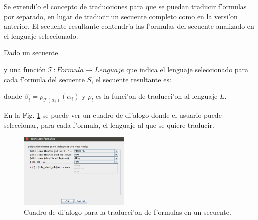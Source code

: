 Se extendi'o el concepto de traducciones para que se puedan traducir f'ormulas por separado, en lugar de traducir un secuente completo como en la versi'on anterior.
El secuente resultante contendr'a las f'ormulas del secuente analizado en el lenguaje seleccionado.

Dado un secuente 

\begin{prooftree}
\end{prooftree}
y una función  $\mathcal{T}:Formula\rightarrow Lenguaje$ que indica el lenguaje seleccionado para cada f'ormula del secuente $S$, el secuente resultante es:
\begin{prooftree}
\end{prooftree}
donde 
$\beta_{i} = \rho_{\mathcal{T}(\alpha_i)}(\alpha_i)$ y $\rho_l$ es la funci'on de traducci'on al lenguaje $L$.

En la Fig. \ref{GUI form translation} se puede ver un cuadro de di'alogo donde el usuario puede seleccionar, para cada f'ormula, el lenguaje al que se quiere traducir.

\begin{figure}[tbh]
	\includegraphics[width=200px]{img/translate.png}
	\centering
	\caption{Cuadro de di'alogo para la traducci'on de f'ormulas en un secuente.} \label{GUI form translation}
\end{figure}

